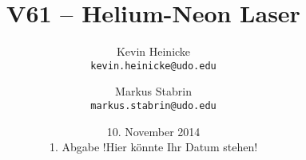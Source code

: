 



\title{%
    V61 -- Helium-Neon Laser
}
\author{%
    Kevin Heinicke\\
    \texttt{kevin.heinicke@udo.edu}
    \and
    Markus Stabrin\\
    \texttt{markus.stabrin@udo.edu}
}
\date{%
    10. November 2014\\
    {\small 1. Abgabe} !Hier könnte Ihr Datum stehen!
}

    \maketitle%
    \tableofcontents
    \newpage

    
    
    \printbibliography
